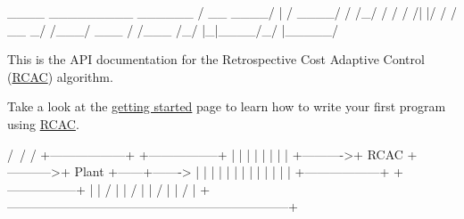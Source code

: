 \begin{DoxyVerb}    ____  _________   ______
   / __ \/ ____/   | / ____/
  / /_/ / /   / /| |/ /     
 / __ _/ /___/ ___ / /___   
/_/ |_|\____/_/  |_\____/   \end{DoxyVerb}
 This is the A\+PI documentation for the Retrospective Cost Adaptive Control (\hyperlink{class_r_c_a_c}{R\+C\+AC}) algorithm.

Take a look at the \hyperlink{_getting_started}{getting started} page to learn how to write your first program using \hyperlink{class_r_c_a_c}{R\+C\+AC}. \begin{DoxyVerb}                          /\
                         /
                        /
            +------------------+            +-----------------+
            |                  |            |                 |
            |                  |            |                 |
+---------->+       RCAC       +----------->+      Plant      +------+------->
|           |                  |            |                 |      |
|           |                  |            |                 |      |
|           +------------------+            +-----------------+      |
|                /                                                   |
|               /                                                    |
|              /                                                     |
|             /                                                      |
+--------------------------------------------------------------------+
\end{DoxyVerb}
 